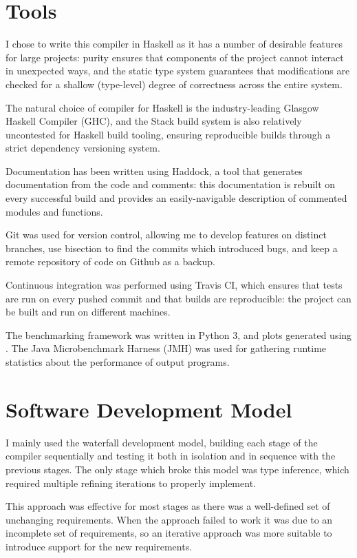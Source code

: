 \documentclass[dissertation.tex]{subfiles}
\begin{document}
\section{Tools}
{

    I chose to write this compiler in Haskell as it has a number of desirable features for large projects: purity
    ensures that components of the project cannot interact in unexpected ways, and the static type system guarantees
    that modifications are checked for a shallow (type-level) degree of correctness across the entire system.

    The natural choice of compiler for Haskell is the industry-leading Glasgow Haskell Compiler (GHC), and the Stack
    build system is also relatively uncontested for Haskell build tooling, ensuring reproducible builds through a strict
    dependency versioning system.

    Documentation has been written using Haddock, a tool that generates documentation from the code and comments: this
    documentation is rebuilt on every successful build and provides an easily-navigable description of commented modules
    and functions.

    Git was used for version control, allowing me to develop features on distinct branches, use bisection to find the
    commits which introduced bugs, and keep a remote repository of code on Github as a backup.

    Continuous integration was performed using Travis CI, which ensures that tests are run on every pushed commit and
    that builds are reproducible: the project can be built and run on different machines.

    The benchmarking framework was written in Python 3, and plots generated using . The Java
    Microbenchmark Harness (JMH) was used for gathering runtime statistics about the performance of output programs.

}
\section{Software Development Model}
{

    I mainly used the waterfall development model, building each stage of the compiler sequentially and testing it both
    in isolation and in sequence with the previous stages. The only stage which broke this model was type inference,
    which required multiple refining iterations to properly implement.

    This approach was effective for most stages as there was a well-defined set of unchanging requirements. When the
    approach failed to work it was due to an incomplete set of requirements, so an iterative approach was more suitable
    to introduce support for the new requirements.

}
\end{document}

